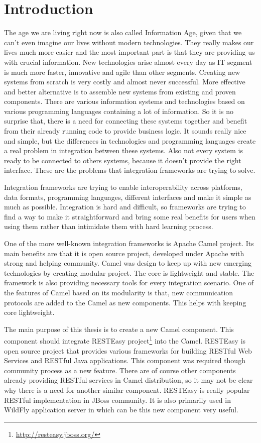\documentclass[12pt,final,oneside]{fithesis2}
\begin{document}
\chapter{Introduction}
The age we are living right now is also called Information Age, given that we can't even imagine our lives without modern technologies. They really makes our lives much more easier and the most important part is that they are providing us with crucial information. New technologies arise almost every day as IT segment is much more faster, innovative and agile than other segments. Creating new systems from scratch is very costly and almost never successful. More effective and better alternative is to assemble new systems from existing and proven components. There are various information systems and technologies based on various programming languages containing a lot of information. So it is no surprise that, there is a need for connecting these systems together and benefit from their already running code to provide business logic. It sounds really nice and simple, but the differences in technologies and programming languages create a real problem in integration between these systems. Also not every system is ready to be connected to others systems, because it doesn't provide the right interface. These are the problems that integration frameworks are trying to solve.

Integration frameworks are trying to enable interoperability across platforms, data formats, programming languages, different interfaces and make it simple as much as possible. Integration is hard and difficult, so frameworks are trying to find a way to make it straightforward and bring some real benefits for users when using them rather than intimidate them with hard learning process.

One of the more well-known integration frameworks is Apache Camel project\cite{camel-web}. Its main benefits are that it is open source project, developed under Apache with strong and helping community. Camel was design to keep up with new emerging technologies by creating modular project. The core is lightweight and stable. The framework is also providing necessary tools for every integration scenario. One of the features of Camel  based on its modularity is that, new communication protocols are added to the Camel as new components. This helps with keeping core lightweight. 

The main purpose of this thesis is to create a new Camel component. This component should integrate RESTEasy project\footnote{\url{http://resteasy.jboss.org/}} into the Camel. RESTEasy is open source project that provides various frameworks for building RESTful Web Services and RESTful Java applications. This component was required though community process as a new feature. There are of course other components already providing RESTful services in Camel distribution, so it may not be clear why there is a need for another similar component. RESTEasy is really popular RESTful implementation in JBoss community. It is also primarily used in WildFly application server in which can be this new component very useful.
\end{document}
